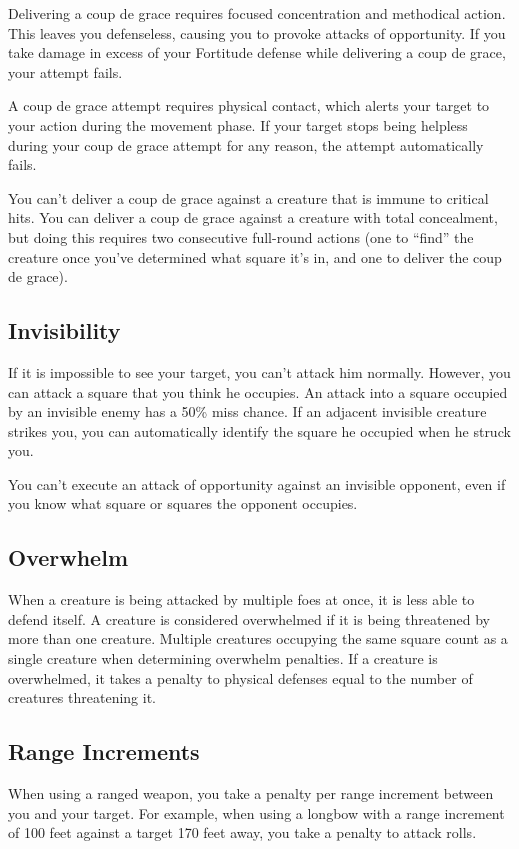 Delivering a coup de grace requires focused concentration and methodical action. This leaves you defenseless, causing you to provoke attacks of opportunity. If you take damage in excess of your Fortitude defense while delivering a coup de grace, your attempt fails.

A coup de grace attempt requires physical contact, which alerts your target to your action during the movement phase. If your target stops being helpless during your coup de grace attempt for any reason, the attempt automatically fails.

You can't deliver a coup de grace against a creature that is immune to critical hits. You can deliver a coup de grace against a creature with total concealment, but doing this requires two consecutive full-round actions (one to ``find'' the creature once you've determined what square it's in, and one to deliver the coup de grace).

\subsection{Invisibility}
If it is impossible to see your target, you can't attack him normally. However, you can attack a square that you think he occupies. An attack into a square occupied by an invisible enemy has a 50\% miss chance. If an adjacent invisible creature strikes you, you can automatically identify the square he occupied when he struck you.

You can't execute an attack of opportunity against an invisible opponent, even if you know what square or squares the opponent occupies.

\subsection{Overwhelm}\label{Overwhelm}
When a creature is being attacked by multiple foes at once, it is less able to defend itself. A creature is considered overwhelmed if it is being threatened by more than one creature. Multiple creatures occupying the same square count as a single creature when determining overwhelm penalties. If a creature is overwhelmed, it takes a penalty to physical defenses equal to the number of creatures threatening it.

\subsection{Range Increments}
When using a ranged weapon, you take a  penalty per range increment between you and your target. For example, when using a longbow with a range increment of 100 feet against a target 170 feet away, you take a  penalty to attack rolls.

